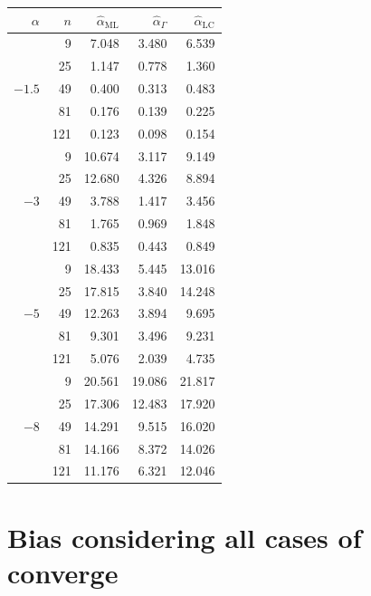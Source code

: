 \documentclass[10pt,a4paper]{article}
\begin{document}
\begin{minipage}{0.5\linewidth}
\begin{tabular}{rrrrr}
	\toprule
	$\alpha$ & $n$ & $\widehat{\alpha}_{\text{ML}}$ & $\widehat{\alpha}_{\Gamma}$ & $\widehat{\alpha}_{\text{LC}}$\\  
	\midrule
	\multirow{5 }{*}{$-1.5$} 
	& 9 & 7.048 & 3.480 & 6.539 \\ 
	& 25 & 1.147 & 0.778 & 1.360 \\ 
	& 49 & 0.400 & 0.313 & 0.483 \\ 
	& 81 & 0.176 & 0.139 & 0.225 \\ 
	& 121 & 0.123 & 0.098 & 0.154 \\  
	\midrule
	\multirow{5 }{*}{$-3$}  
	& 9 & 10.674 & 3.117 & 9.149 \\ 
	& 25 & 12.680 & 4.326 & 8.894 \\ 
	& 49 & 3.788 & 1.417 & 3.456 \\ 
	& 81 & 1.765 & 0.969 & 1.848 \\ 
	& 121 & 0.835 & 0.443 & 0.849 \\  
	\midrule
	\multirow{5 }{*}{$-5$}  
	& 9 & 18.433 & 5.445 & 13.016 \\ 
	& 25 & 17.815 & 3.840 & 14.248 \\ 
	& 49 & 12.263 & 3.894 & 9.695 \\ 
	& 81 & 9.301 & 3.496 & 9.231 \\ 
	& 121 & 5.076 & 2.039 & 4.735 \\  
	\midrule
	\multirow{5 }{*}{$-8$}  
	& 9 & 20.561 & 19.086 & 21.817 \\ 
	& 25 & 17.306 & 12.483 & 17.920 \\ 
	& 49 & 14.291 & 9.515 & 16.020 \\ 
	& 81 & 14.166 & 8.372 & 14.026 \\ 
	& 121 & 11.176 & 6.321 & 12.046 \\ 
	\bottomrule
\end{tabular}
\end{minipage}

\vspace{0.5cm}

\newpage
\section{Bias considering all cases of converge}
\end{document}
